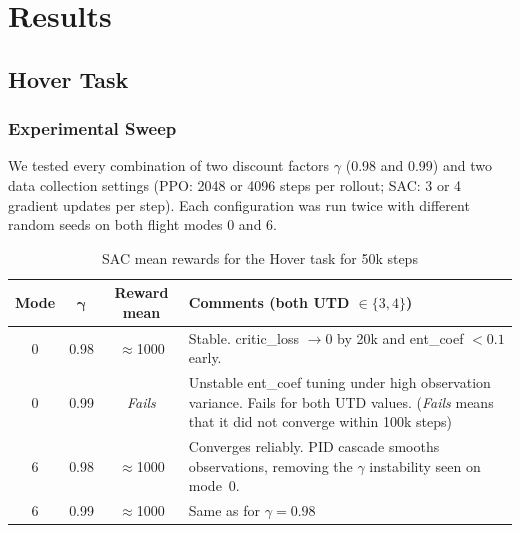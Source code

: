 \documentclass[11pt,a4paper]{article}
\begin{document}
\section{Results}

\subsection{Hover Task}

\subsubsection{Experimental Sweep}

We tested every combination of two discount factors $\gamma$ (0.98 and 0.99) and two data collection settings (PPO: 2048 or 4096 steps per rollout; SAC: 3 or 4 gradient updates per step). Each configuration was run twice with different random seeds on both flight modes 0 and 6.

\begin{table}[H]
\centering
\small
\renewcommand{\arraystretch}{1.35}
\begin{tabular}{@{} c c c >{\centering\arraybackslash}p{6.2cm} @{}}
\toprule
\textbf{Mode} & $\boldsymbol{\gamma}$ & \textbf{Reward mean} & \textbf{Comments (both UTD $\in \{3,4\}$)} \\
\midrule
0 & 0.98 & $\approx$1000 & 
  Stable. critic\_loss $\to 0$ by 20k and ent\_coef $< 0.1$ early. \\
0 & 0.99 & \textit{Fails} &
  Unstable ent\_coef tuning under high observation variance. Fails for both UTD values. (\textit{Fails} means that it did not converge within 100k steps) \\[6pt]
\midrule
6 & 0.98 & $\approx$1000 & 
  Converges reliably. PID cascade smooths observations, removing the $\gamma$ instability seen on mode~0. \\
6 & 0.99 & $\approx$1000 &  
  Same as for $\gamma = 0.98$\\
\bottomrule
\end{tabular}
\caption{SAC mean rewards for the Hover task for 50k steps}
\label{tab:hover-sac}
\end{table}
\end{document}
